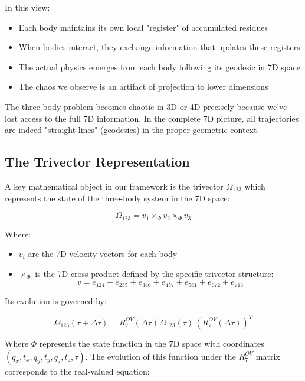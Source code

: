 \documentclass{article}
\begin{document}
In this view:
\begin{itemize}
\item Each body maintains its own local "register" of accumulated residues
\item When bodies interact, they exchange information that updates these registers
\item The actual physics emerges from each body following its geodesic in 7D space
\item The chaos we observe is an artifact of projection to lower dimensions
\end{itemize}

The three-body problem becomes chaotic in 3D or 4D precisely because we've lost access to the full 7D information. In the complete 7D picture, all trajectories are indeed "straight lines" (geodesics) in the proper geometric context.

\subsection{The Trivector Representation}

A key mathematical object in our framework is the trivector $\Omega_{123}$ which represents the state of the three-body system in the 7D space:

\begin{equation}
\Omega_{123} = v_1 \times_\Phi v_2 \times_\Phi v_3
\end{equation}

Where:
\begin{itemize}
\item $v_i$ are the 7D velocity vectors for each body
\item $\times_\Phi$ is the 7D cross product defined by the specific trivector structure:
\begin{equation}
v = e_{124} + e_{235} + e_{346} + e_{457} + e_{561} + e_{672} + e_{713}
\end{equation}
\end{itemize}

Its evolution is governed by:

\begin{equation}
\Omega_{123}(\tau+\Delta\tau) = R^{OV}_7(\Delta\tau) \, \Omega_{123}(\tau) \, (R^{OV}_7(\Delta\tau))^T
\end{equation}

Where $\Phi$ represents the state function in the 7D space with coordinates $(q_x, t_x, q_y, t_y, q_z, t_z, \tau)$. The evolution of this function under the $R^{OV}_7$ matrix corresponds to the real-valued equation:
\end{document}
